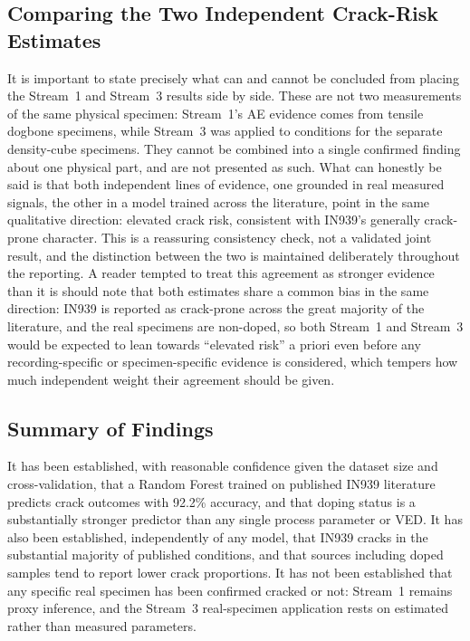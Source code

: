 \documentclass[a4paper]{article}
\begin{document}
\subsection{Comparing the Two Independent Crack-Risk Estimates}
It is important to state precisely what can and cannot be concluded from placing the Stream~1 and Stream~3 results side by side. These are not two measurements of the same physical specimen: Stream~1's AE evidence comes from tensile dogbone specimens, while Stream~3 was applied to conditions for the separate density-cube specimens. They cannot be combined into a single confirmed finding about one physical part, and are not presented as such. What can honestly be said is that both independent lines of evidence, one grounded in real measured signals, the other in a model trained across the literature, point in the same qualitative direction: elevated crack risk, consistent with IN939's generally crack-prone character. This is a reassuring consistency check, not a validated joint result, and the distinction between the two is maintained deliberately throughout the reporting. A reader tempted to treat this agreement as stronger evidence than it is should note that both estimates share a common bias in the same direction: IN939 is reported as crack-prone across the great majority of the literature, and the real specimens are non-doped, so both Stream~1 and Stream~3 would be expected to lean towards ``elevated risk'' a priori even before any recording-specific or specimen-specific evidence is considered, which tempers how much independent weight their agreement should be given.

\subsection{Summary of Findings}
It has been established, with reasonable confidence given the dataset size and cross-validation, that a Random Forest trained on published IN939 literature predicts crack outcomes with 92.2\% accuracy, and that doping status is a substantially stronger predictor than any single process parameter or VED. It has also been established, independently of any model, that IN939 cracks in the substantial majority of published conditions, and that sources including doped samples tend to report lower crack proportions. It has not been established that any specific real specimen has been confirmed cracked or not: Stream~1 remains proxy inference, and the Stream~3 real-specimen application rests on estimated rather than measured parameters.
\end{document}
